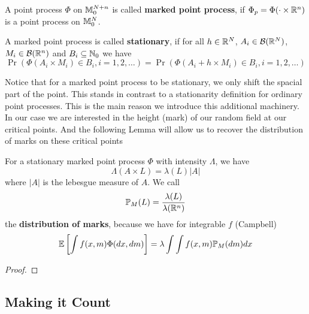 \begin{definition}
	A point process \(\Phi\) on \(\locFiniteMeasure[\dimension+n]\) is called
	\textbf{marked point process}, if \(\Phi_p = \Phi(\cdot \times \real^n)\)
	is a point process on \(\locFiniteMeasure\).

	A marked point process is called \textbf{stationary}, if for all
	\(h\in\real^\dimension\), \(A_i\in\borel(\real^\dimension)\),
	\(M_i\in\borel(\real^n)\) and \(B_i\subseteq\nat_0\) we have
	\[
		\Pr(\Phi(A_i\times M_i) \in B_i, i=1,2,\dots)
		= \Pr(\Phi(A_i+h \times M_i)\in B_i, i=1,2,\dots)
	\]
\end{definition}

Notice that for a marked point process to be stationary, we only shift the
spacial part of the point. This stands in contrast to a stationarity definition
for ordinary point processes. This is the main reason we introduce this
additional machinery. In our case we are interested in the height (mark) of
our random field at our critical points. And the following Lemma will allow us
to recover the distribution of marks on these critical points

\begin{lemma}[Campbell]\label{lem: Campbell}
	For a stationary marked point process \(\Phi\) with intensity \(\Lambda\),
	we have	
	\[
		\Lambda(A \times L) = \lambda(L) |A|
	\]
	where \(|A|\) is the lebesgue measure of \(A\). We call
	\[
		\Pr_M(L) = \frac{\lambda(L)}{\lambda(\real^n)}
	\]
	the \textbf{distribution of marks}, because we have for integrable \(f\)
	(Campbell)
	\[
		\E\left[\int f(x,m) \Phi(dx,dm)\right]
		= \lambda \int \int f(x,m) \Pr_M(dm) dx
	\]
\end{lemma}
\begin{proof}
\end{proof}

\subsection{Making it Count}

